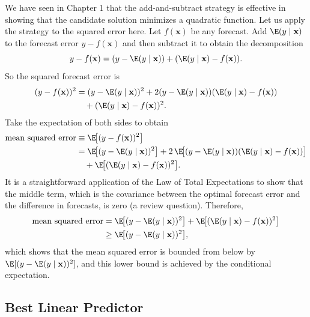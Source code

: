 We have seen in Chapter 1 that the add-and-subtract strategy is effective in showing
that the candidate solution minimizes a quadratic function. Let us apply the
strategy to the squared error here. Let $f(\mathbf{x})$ be any forecast. Add $\E(y \mid \mathbf{x})$ to the
forecast error $y - f(\mathbf{x})$ and then subtract it to obtain the decomposition
%
\begin{equation}
y - f(\mathbf{x}) = (y - \E(y \mid \mathbf{x})) + (\E(y \mid \mathbf{x}) - f(\mathbf{x})).
\label{eq:2.9.1}
\end{equation}
%
So the squared forecast error is
%
\begin{align}
(y - f(\mathbf{x}))^2 &= (y - \E(y \mid \mathbf{x}))^2
  + 2(y - \E(y \mid \mathbf{x}))(\E(y \mid \mathbf{x}) - f(\mathbf{x})) \notag \\
  &\quad + (\E(y \mid \mathbf{x}) - f(\mathbf{x}))^2.
\label{eq:2.9.2}
\end{align}
%
Take the expectation of both sides to obtain
%
\begin{align}
\text{mean squared error} &\equiv \E\!\big[(y - f(\mathbf{x}))^2\big] \notag \\
&= \E\!\big[(y - \E(y \mid \mathbf{x}))^2\big]
  + 2\,\E\!\big[(y - \E(y \mid \mathbf{x}))(\E(y \mid \mathbf{x}) - f(\mathbf{x}))\big] \notag \\
&\quad + \E\!\big[(\E(y \mid \mathbf{x}) - f(\mathbf{x}))^2\big].
\label{eq:2.9.3}
\end{align}
%
It is a straightforward application of the Law of Total Expectations to show that
the middle term, which is the covariance between the optimal forecast error and the
difference in forecasts, is zero (a review question). Therefore,
%
\begin{align}
\text{mean squared error} &= \E\!\big[(y - \E(y \mid \mathbf{x}))^2\big]
  + \E\!\big[(\E(y \mid \mathbf{x}) - f(\mathbf{x}))^2\big] \notag \\
&\geq \E\!\big[(y - \E(y \mid \mathbf{x}))^2\big],
\label{eq:2.9.4}
\end{align}
%
which shows that the mean squared error is bounded from below by
$\E[(y - \E(y \mid \mathbf{x}))^2]$, and this lower bound is achieved by the conditional expectation.

\subsection*{Best Linear Predictor}

